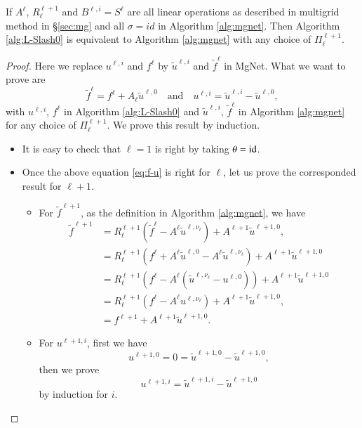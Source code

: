 \begin{theorem}\label{thm:mg-mgnet}
	If $A^\ell$, $R_\ell^{\ell+1}$ and $B^{\ell,i} = S^{\ell}$ are all linear operations as described in multigrid method
	in \S \ref{sec:mg} and all $\sigma = id$ in Algorithm \ref{alg:mgnet}. 
	Then Algorithm \ref{alg:L-Slash0} is equivalent to Algorithm \ref{alg:mgnet} with any choice of $\Pi_\ell^{\ell+1}$.
\end{theorem}
\begin{proof}
	Here we replace $u^{\ell,i}$ and $f^{\ell}$ by $\tilde u^{\ell,i}$ and $\tilde f^{\ell}$ in MgNet. 
	What we want to prove are
	\begin{equation}\label{eq:f-u}
	\tilde f^{\ell} =  f^{\ell} + A_\ell \tilde u^{\ell,0} \quad \text{and} \quad u^{\ell,i} = \tilde u^{\ell, i} - \tilde u^{\ell, 0},
	\end{equation}
	with $u^{\ell,i}$, $f^\ell$ in Algorithm \ref{alg:L-Slash0} and 
	$\tilde u^{\ell,i}$, $\tilde f^\ell$ in Algorithm \ref{alg:mgnet} for any choice of $\Pi_\ell^{\ell+1}$. 
	We prove this result by induction. 
	\begin{itemize}
		\item It is easy to check that $\ell = 1$ is right by taking $\theta  = \rm{id}$. 
		\item Once the above equation \eqref{eq:f-u} is right for $\ell$, 
		let us prove the corresponded result for $\ell+1$.
		\begin{itemize}
			\item For $\tilde f^{\ell+1}$, as the definition in Algorithm \ref{alg:mgnet}, we have
			\begin{align*}
			\tilde f^{\ell+1} &= R_\ell^{\ell+1}(\tilde f^\ell - A^\ell \tilde u^{\ell,\nu_\ell}) + A^{\ell+1}\tilde u^{\ell+1,0}, \\
			&= R_\ell^{\ell+1}(f^\ell + A^{\ell} \tilde u^{\ell,0}- A^{\ell} \tilde u^{\ell,\nu_\ell}) + A^{\ell+1}\tilde u^{\ell+1,0} \\
			&= R_\ell^{\ell+1}(f^\ell - A^{\ell} (\tilde u^{\ell,\nu_\ell}- u^{\ell,0})) + A^{\ell+1}\tilde u^{\ell+1,0} \\
			&= R_\ell^{\ell+1}(f^\ell - A^{\ell} u^{\ell,\nu_\ell}) + A^{\ell+1}\tilde u^{\ell+1,0}, \\
			&=  f^{\ell+1} + A^{\ell+1}\tilde u^{\ell+1,0}.
			\end{align*}
			\item For $u^{\ell+1,i}$, first we have 
			$$
			u^{\ell+1,0} = 0 =\tilde u^{\ell+1, 0} - \tilde u^{\ell+1, 0},
			$$
			then we prove 
			\begin{equation}\label{u:i+1}
			u^{\ell+1,i} = \tilde u^{\ell+1, i} - \tilde u^{\ell+1, 0}
			\end{equation} by induction for $i$.
	

\end{itemize}
\end{itemize}
\end{proof}
